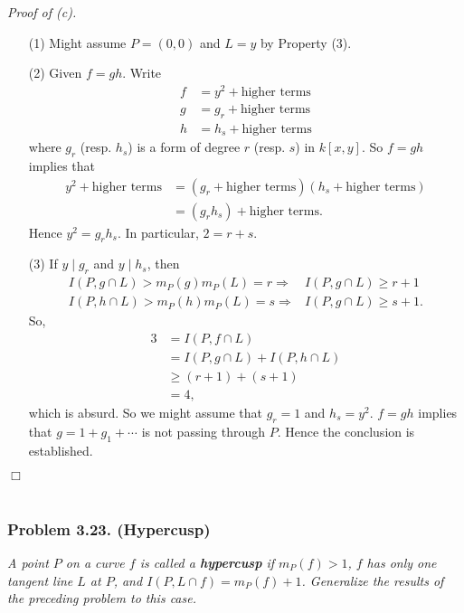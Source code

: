 \documentclass{article}
\begin{document}
\emph{Proof of (c).}
\begin{enumerate}
\item[(1)]
  Might assume $P = (0,0)$ and $L = y$ by Property (3).

\item[(2)]
  Given $f = gh$.
  Write
  \begin{align*}
    f &= y^2 + \text{higher terms} \\
    g &= g_r + \text{higher terms} \\
    h &= h_s + \text{higher terms}
  \end{align*}
  where $g_r$ (resp. $h_s$) is a form of degree $r$ (resp. $s$) in $k[x,y]$.
  So $f = gh$ implies that
  \begin{align*}
    y^2 + \text{higher terms}
    &= (g_r + \text{higher terms})(h_s + \text{higher terms}) \\
    &= (g_r h_s) + \text{higher terms}.
  \end{align*}
  Hence $y^2 = g_r h_s$. In particular, $2 = r+s$.

\item[(3)]
  If $y \mid g_r$ and $y \mid h_s$, then
  \begin{align*}
    I(P, g \cap L) > m_P(g) m_P(L) = r \Longrightarrow& I(P, g \cap L) \geq r+1 \\
    I(P, h \cap L) > m_P(h) m_P(L) = s \Longrightarrow& I(P, g \cap L) \geq s+1.
  \end{align*}
  So,
  \begin{align*}
    3
    &= I(P, f \cap L) \\
    &= I(P, g \cap L) + I(P, h \cap L) \\
    &\geq (r+1) + (s+1) \\
    &= 4,
  \end{align*}
  which is absurd.
  So we might assume that $g_r = 1$ and $h_s = y^2$.
  $f = gh$ implies that $g = 1 + g_1 + \cdots$ is not passing through $P$.
  Hence the conclusion is established.
\end{enumerate}
$\Box$ \\\\






\subsubsection*{Problem 3.23. (Hypercusp)}
\emph{A point $P$ on a curve $f$ is called a \textbf{hypercusp} if $m_P(f) > 1$,
$f$ has only one tangent line $L$ at $P$,
and $I(P, L \cap f) = m_P(f) + 1$.
Generalize the results of the preceding problem to this case.} \\
\end{document}
